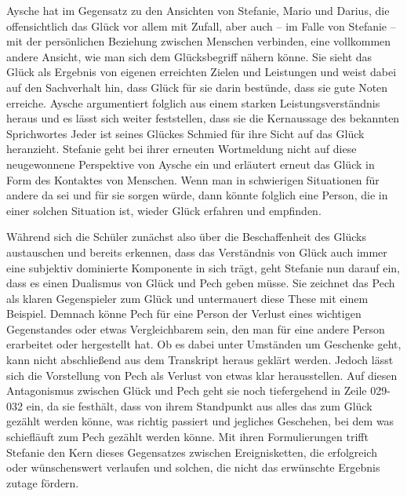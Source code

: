 Aysche hat im Gegensatz zu den Ansichten von Stefanie, Mario und Darius, die offensichtlich das Glück vor allem mit Zufall, aber auch -- im Falle von Stefanie -- mit der persönlichen Beziehung zwischen Menschen verbinden, eine vollkommen andere Ansicht, wie man sich dem Glücksbegriff nähern könne. 
Sie sieht das Glück als Ergebnis von eigenen erreichten Zielen und Leistungen und weist dabei auf den Sachverhalt hin, dass Glück für sie darin bestünde, dass sie gute Noten erreiche. 
Aysche argumentiert folglich aus einem starken Leistungsverständnis heraus und es lässt sich weiter feststellen, dass sie die Kernaussage des bekannten Sprichwortes \glqq Jeder ist seines Glückes Schmied\grqq{} für ihre Sicht auf das Glück heranzieht. 
Stefanie geht bei ihrer erneuten Wortmeldung nicht auf diese neugewonnene Perspektive von Aysche ein und erläutert erneut das Glück in Form des Kontaktes von Menschen. 
Wenn man in schwierigen Situationen für andere da sei und für sie sorgen würde, dann könnte folglich eine Person, die in einer solchen Situation ist, wieder Glück erfahren und empfinden. 

Während sich die Schüler zunächst also über die Beschaffenheit des Glücks austauschen und bereits erkennen, dass das Verständnis von Glück auch immer eine subjektiv dominierte Komponente in sich trägt, geht Stefanie nun darauf ein, dass es einen Dualismus von Glück und Pech geben müsse.
Sie zeichnet das Pech als klaren Gegenspieler zum Glück und untermauert diese These mit einem Beispiel. 
Demnach könne Pech für eine Person der Verlust eines wichtigen Gegenstandes oder etwas Vergleichbarem sein, den man für eine andere Person erarbeitet oder hergestellt hat. 
Ob es dabei unter Umständen um Geschenke geht, kann nicht abschließend aus dem Transkript heraus geklärt werden. 
Jedoch lässt sich die Vorstellung von Pech als Verlust von etwas klar herausstellen. 
Auf diesen Antagonismus zwischen Glück und Pech geht sie noch tiefergehend in Zeile 029-032 ein, da sie festhält, dass von ihrem Standpunkt aus alles das zum Glück gezählt werden könne, was \glqq richtig passiert\grqq{} und jegliches Geschehen, bei dem \glqq was schiefläuft\grqq{} zum Pech gezählt werden könne.
Mit ihren Formulierungen trifft Stefanie den Kern dieses Gegensatzes zwischen Ereignisketten, die erfolgreich oder wünschenswert verlaufen und solchen, die nicht das erwünschte Ergebnis zutage fördern. 

